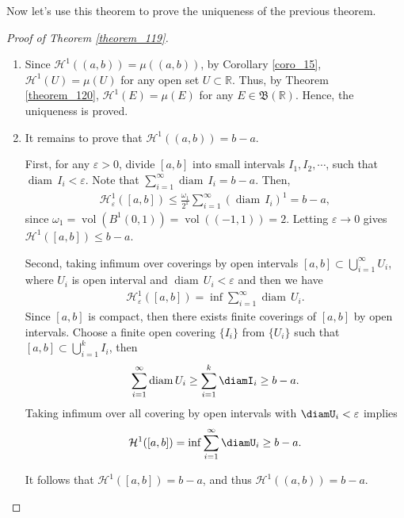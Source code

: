 \documentclass[11pt]{book}
\theoremstyle{definition}
\numberwithin{equation}{chapter}
\def\BB{\mathfrak{B}}
\def\H{{\mathcal H}}
\def\diam{{\operatorname{diam}\,}}
\begin{document}
\medskip

Now let's use this theorem to prove the uniqueness of the previous theorem.

\medskip

\begin{proof}[Proof of Theorem \ref{theorem_119}]
~\begin{enumerate}[label=(\alph*)]
    \item Since $\H^1((a,b)) = \mu((a,b))$, by Corollary \ref{coro_15}, $\H^1(U) = \mu(U)$ for any open set $U \subset \mathbb{R}$. Thus, by Theorem \ref{theorem_120}, $\H^1(E) = \mu(E)$ for any $E \in \BB(\mathbb{R})$. Hence, the uniqueness is proved.
    
    \item It remains to prove that $\H^1((a,b)) = b - a$. 

    First, for any $\varepsilon > 0$, divide $[a,b]$ into small intervals $I_1, I_2, \cdots$, such that $\diam I_i < \varepsilon$. Note that $\sum^\infty_{i=1}\diam I_i = b - a$. Then,
    \begin{align*}
        \H^1_{\varepsilon}([a,b]) \leq \frac{\omega_1}{2^1} \sum^\infty_{i=1}(\diam I_i)^1 = b - a,
    \end{align*}
    since $\omega_1 = \operatorname{vol}\left(B^1(0,1)\right) = \operatorname{vol}\left((-1,1)\right) = 2$. Letting $\varepsilon \to 0$ gives $\H^1([a,b]) \leq b - a$.
    
    Second, taking infimum over coverings by open intervals $[a,b] \subset \bigcup^\infty_{i=1}U_i$, where $U_i$ is open interval and $\diam U_i < \varepsilon$ and then we have
    \begin{align*}
        \H^1_{\varepsilon}([a,b]) = \inf \sum^\infty_{i=1} \diam U_i.
    \end{align*}
    Since $[a,b]$ is compact, then there exists finite coverings of $[a,b]$ by open intervals. Choose a finite open covering $\{I_i\}$ from $\{U_i\}$ such that $[a,b] \subset \bigcup^k_{i=1} I_i$, then 
    \begin{align*}
        \sum^\infty_{i=1}\diam U_i \geq \sum^k_{i=1} \diamI_i \geq b - a.
    \end{align*}
    Taking infimum over all covering by open intervals with $\diamU_i < \varepsilon$ implies
    \begin{align*}
        \H^1([a,b]) = \inf \sum^\infty_{i=1} \diamU_i \geq b - a.
    \end{align*}
    
    It follows that $\H^1([a,b]) = b - a$, and thus $\H^1((a,b)) = b - a$.
\end{enumerate}
\end{proof}
\end{document}
